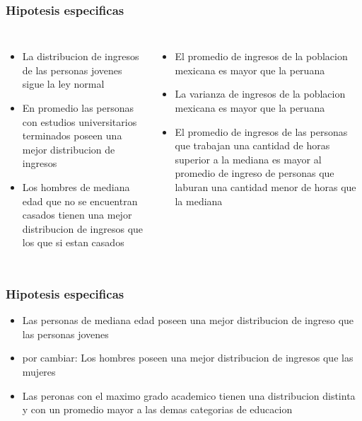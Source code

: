 \documentclass{beamer}
\begin{document}
\begin{frame}
\frametitle{Hipotesis especificas}

\begin{columns}

\begin{itemize}
    \item La distribucion de ingresos de las personas jovenes sigue
      la ley normal
    \item En \alert{promedio} las personas con
      estudios universitarios terminados poseen una mejor distribucion
      de ingresos
    \item Los hombres de mediana edad que no se encuentran casados
      tienen una mejor distribucion de ingresos que los que si estan casados
\end{itemize}


\begin{itemize}
    \item El promedio de ingresos de la poblacion mexicana es mayor
      que la peruana
    \item La varianza de ingresos de la poblacion mexicana es mayor
      que la peruana
    \item El \alert{promedio de ingresos} de las personas que trabajan
      una cantidad de horas superior a la mediana es mayor al promedio
      de ingreso de personas que laburan una cantidad menor de horas
      que la mediana
\end{itemize}
\end{columns}
\end{frame}


\begin{frame}
\frametitle{Hipotesis especificas}
\begin{itemize}
    \item Las personas de mediana edad poseen una mejor distribucion
      de ingreso que las personas jovenes
    \item \alert{por cambiar:} Los hombres poseen una mejor distribucion de ingresos
      que las mujeres
    \item Las peronas con el maximo grado academico tienen una distribucion
      distinta y con un promedio mayor a las demas categorias de educacion
\end{itemize}

\end{frame}
\end{document}
